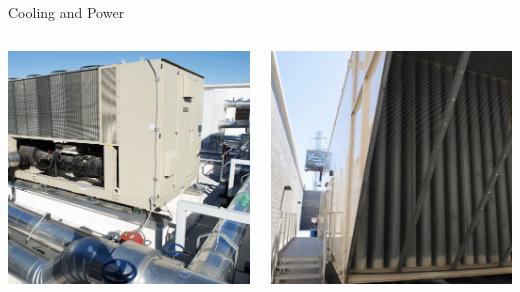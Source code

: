 \begin{frame}{Cooling and Power}
\begin{columns}
\begin{column}{0.5\textwidth}
\begin{center}
\includegraphics[width=\textwidth]{figures/cooling.jpg}
\end{center}
\end{column}
\begin{column}{0.5\textwidth}
\begin{center}
\includegraphics[width=\textwidth]{figures/power.jpg}
\end{center}
\end{column}
\end{columns}
\end{frame}

